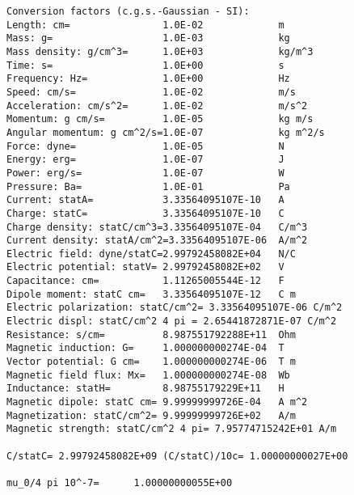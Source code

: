 \documentclass[12pt,a4paper,twoside]{report}
\begin{document}
{\begin{tcolorbox}
\begin{verbatim}
Conversion factors (c.g.s.-Gaussian - SI):
Length: cm=                1.0E-02             m
Mass: g=                   1.0E-03             kg
Mass density: g/cm^3=      1.0E+03             kg/m^3
Time: s=                   1.0E+00             s
Frequency: Hz=             1.0E+00             Hz
Speed: cm/s=               1.0E-02             m/s
Acceleration: cm/s^2=      1.0E-02             m/s^2
Momentum: g cm/s=          1.0E-05             kg m/s
Angular momentum: g cm^2/s=1.0E-07             kg m^2/s
Force: dyne=               1.0E-05             N
Energy: erg=               1.0E-07             J
Power: erg/s=              1.0E-07             W
Pressure: Ba=              1.0E-01             Pa
Current: statA=            3.33564095107E-10   A
Charge: statC=             3.33564095107E-10   C
Charge density: statC/cm^3=3.33564095107E-04   C/m^3
Current density: statA/cm^2=3.33564095107E-06  A/m^2
Electric field: dyne/statC=2.99792458082E+04   N/C
Electric potential: statV= 2.99792458082E+02   V
Capacitance: cm=           1.11265005544E-12   F
Dipole moment: statC cm=   3.33564095107E-12   C m
Electric polarization: statC/cm^2= 3.33564095107E-06 C/m^2
Electric displ: statC/cm^2 4 pi = 2.65441872871E-07 C/m^2
Resistance: s/cm=          8.987551792288E+11  Ohm
Magnetic induction: G=     1.000000000274E-04  T
Vector potential: G cm=    1.000000000274E-06  T m
Magnetic field flux: Mx=   1.000000000274E-08  Wb
Inductance: statH=         8.98755179229E+11   H
Magnetic dipole: statC cm= 9.99999999726E-04   A m^2
Magnetization: statC/cm^2= 9.99999999726E+02   A/m
Magnetic strength: statC/cm^2 4 pi= 7.95774715242E+01 A/m

C/statC= 2.99792458082E+09 (C/statC)/10c= 1.00000000027E+00

mu_0/4 pi 10^-7=      1.00000000055E+00


\end{verbatim}
\end{tcolorbox}}
\end{document}
